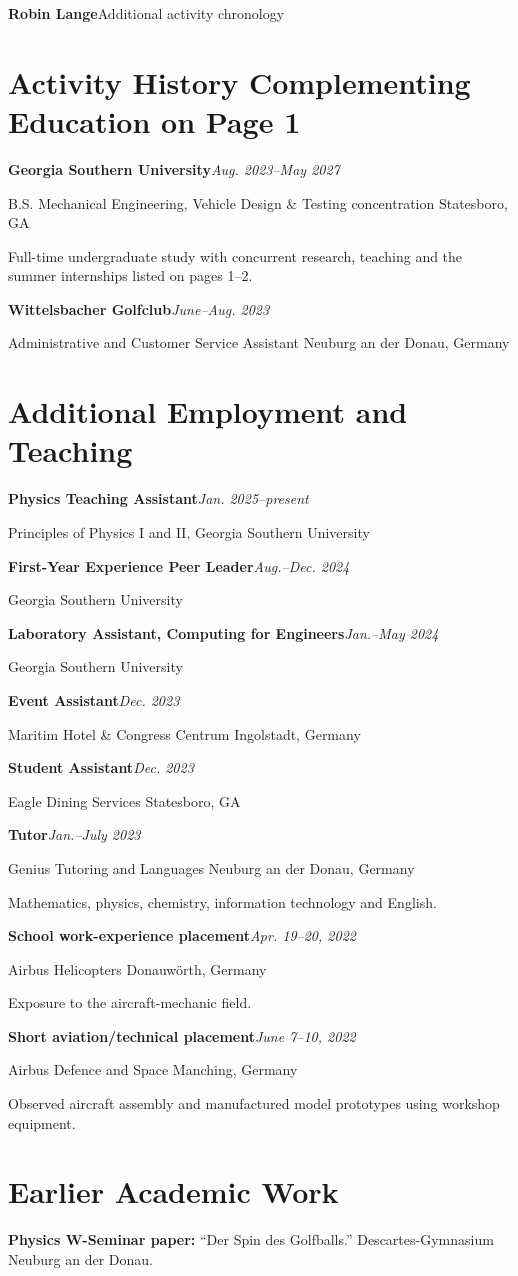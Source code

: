\newcommand{\historyrole}[3]{\textbf{#1}\hfill\textit{#2}\par #3\par\vspace{5pt}}
{\large\bfseries Robin Lange}\hfill Additional activity chronology\par
\section{Activity History Complementing Education on Page 1}
\historyrole{Georgia Southern University}{Aug. 2023--May 2027}{B.S. Mechanical Engineering, Vehicle Design \& Testing concentration \hfill Statesboro, GA}
Full-time undergraduate study with concurrent research, teaching and the summer internships listed on pages 1--2.\par
\historyrole{Wittelsbacher Golfclub}{June--Aug. 2023}{Administrative and Customer Service Assistant \hfill Neuburg an der Donau, Germany}
\section{Additional Employment and Teaching}
\historyrole{Physics Teaching Assistant}{Jan. 2025--present}{Principles of Physics I and II, Georgia Southern University}
\historyrole{First-Year Experience Peer Leader}{Aug.--Dec. 2024}{Georgia Southern University}
\historyrole{Laboratory Assistant, Computing for Engineers}{Jan.--May 2024}{Georgia Southern University}
\historyrole{Event Assistant}{Dec. 2023}{Maritim Hotel \& Congress Centrum \hfill Ingolstadt, Germany}
\historyrole{Student Assistant}{Dec. 2023}{Eagle Dining Services \hfill Statesboro, GA}
\historyrole{Tutor}{Jan.--July 2023}{Genius Tutoring and Languages \hfill Neuburg an der Donau, Germany}
Mathematics, physics, chemistry, information technology and English.\par
\historyrole{School work-experience placement}{Apr. 19--20, 2022}{Airbus Helicopters \hfill Donauw\"orth, Germany}
Exposure to the aircraft-mechanic field.\par
\historyrole{Short aviation/technical placement}{June 7--10, 2022}{Airbus Defence and Space \hfill Manching, Germany}Observed aircraft assembly and manufactured model prototypes using workshop equipment.
\section{Earlier Academic Work}
{\small \textbf{Physics W-Seminar paper:} ``Der Spin des Golfballs.'' Descartes-Gymnasium Neuburg an der Donau.}
